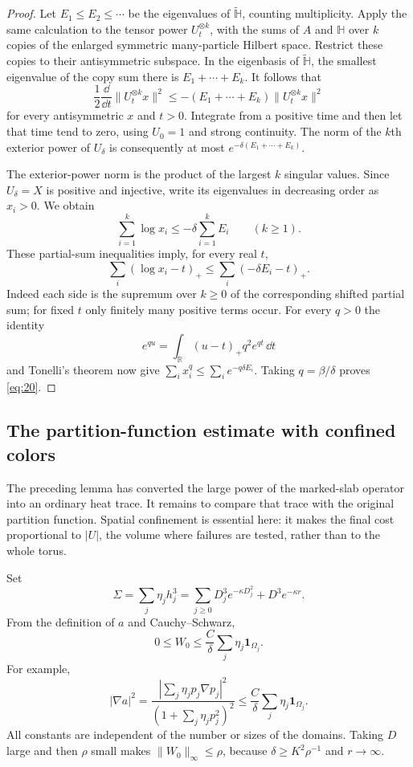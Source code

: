 \begin{proof}
Let $E_1\le E_2\le\cdots$ be the eigenvalues of
$\widetilde{\mathbb H}$, counting multiplicity.  Apply the same
calculation to the tensor power $U_t^{\otimes k}$, with the sums
of $A$ and $\mathbb H$ over $k$ copies of the enlarged symmetric
many-particle Hilbert space.  Restrict these copies to their
antisymmetric subspace.  In the eigenbasis of
$\widetilde{\mathbb H}$, the smallest eigenvalue of the copy sum
there is $E_1+\cdots+E_k$.  It follows that
\[
 \frac12\frac{\dd}{\dd t}\|U_t^{\otimes k}x\|^2
 \le-(E_1+\cdots+E_k)\|U_t^{\otimes k}x\|^2
\]
for every antisymmetric $x$ and $t>0$.  Integrate from a positive
time and then let that time tend to zero, using $U_0=1$ and
strong continuity.  The norm of the $k$th exterior power of
$U_\delta$ is consequently at most
$e^{-\delta(E_1+\cdots+E_k)}$.

The exterior-power norm is the product of the largest $k$
singular values.  Since $U_\delta=X$ is positive and injective,
write its eigenvalues in decreasing order as $x_i>0$.  We obtain
\[
 \sum_{i=1}^k\log x_i
       \le-\delta\sum_{i=1}^k E_i\qquad(k\ge1).
\]
These partial-sum inequalities imply, for every real $t$,
\[
 \sum_i(\log x_i-t)_+
       \le\sum_i(-\delta E_i-t)_+.
\]
Indeed each side is the supremum over $k\ge0$ of the
corresponding shifted partial sum; for fixed $t$ only finitely
many positive terms occur.  For every $q>0$ the identity
\[
 e^{qu}=\int_{\mathbb R}(u-t)_+q^2e^{qt}\,\dd t
\]
and Tonelli's theorem now give
$\sum_i x_i^q\le\sum_i e^{-q\delta E_i}$.  Taking
$q=\beta/\delta$ proves \eqref{eq:20}.
\end{proof}

\subsection{The partition-function estimate with confined colors}

The preceding lemma has converted the large power of the marked-slab
operator into an ordinary heat trace. It remains to compare that trace
with the original partition function. Spatial confinement is essential
here: it makes the final cost proportional to $|U|$, the volume where
failures are tested, rather than to the whole torus.

Set
\[
 \Sigma=\sum_j\eta_jh_j^3
       =\sum_{j\ge0}D_j^3e^{-\kappa D_j^2}
                            +D^3e^{-\kappa r}.
\]
From the definition of $a$ and Cauchy--Schwarz,
\[
 0\le W_0\le\frac C\delta\sum_j\eta_j\mathbf1_{\Omega_j}.
\]
For example,
\[
 |\nabla a|^2
 =\frac{|\sum_j\eta_jp_j\nabla p_j|^2}
                  {(1+\sum_j\eta_jp_j^2)^2}
 \le\frac C\delta\sum_j\eta_j\mathbf1_{\Omega_j}.
\]
All constants are independent of the number or sizes of the
domains.  Taking $D$ large and then $\rho$ small makes
$\|W_0\|_\infty\le\rho$, because
$\delta\ge K^2\rho^{-1}$ and $r\to\infty$.


